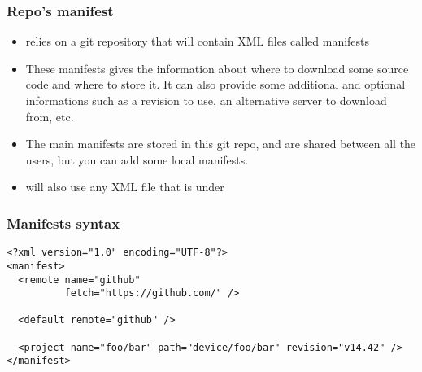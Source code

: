 \begin{frame}
  \frametitle{Repo's manifest}
  \begin{itemize}
  \item {} relies on a git repository that will contain XML
    files called manifests
  \item These manifests gives the information about where to download
    some source code and where to store it. It can also provide some
    additional and optional informations such as a revision to use, an
    alternative server to download from, etc.
  \item The main manifests are stored in this git repo, and are shared
    between all the users, but you can add some local manifests.
  \item {} will also use any XML file that is under
  \end{itemize}
\end{frame}

\begin{frame}[fragile]
  \frametitle{Manifests syntax}
\begin{verbatim}
<?xml version="1.0" encoding="UTF-8"?>
<manifest>
  <remote name="github"
          fetch="https://github.com/" />

  <default remote="github" />

  <project name="foo/bar" path="device/foo/bar" revision="v14.42" />
</manifest>
\end{verbatim}
\end{frame}